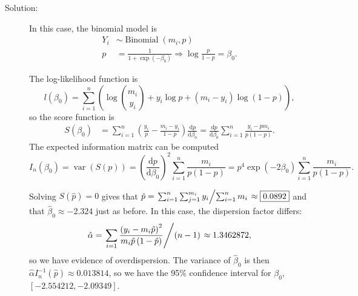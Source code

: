 \documentclass[11pt, letterpaper]{article}
\begin{document}
\begin{enumerate}[(a)]
\begin{description}
\item[Solution:] In this case, the binomial model is
  \begin{align*}
    Y_{i}
    &\sim \operatorname{Binomial}\left(m_i, p\right) \\
    p
    &= \frac{1}{1 + \exp\left(-\beta_0\right)} \Rightarrow
      \log\frac{p}{1 - p} = \beta_0.
  \end{align*}

  The log-likelihood function is
  \begin{equation*}
    l\left(\beta_0\right) = \sum_{i=1}^n\left(
      \log{m_i \choose y_i} + y_i\log p + \left(m_i - y_i\right)\log\left(1 - p\right)
    \right),
  \end{equation*}
  so the score function is
  \begin{align*}
    S\left(\beta_0\right)
    &= \sum_{i=1}^n\left(\frac{y_i}{p} - \frac{m_i - y_i}{1 - p}\right)\frac{\mathrm{d}p}{\mathrm{d}\beta_0}
      = \frac{\mathrm{d}p}{\mathrm{d}\beta_0}\sum_{i=1}^n\frac{y_i - pm_i}{p\left(1 - p\right)}.
  \end{align*}
  The expected information matrix can be computed
  \begin{equation*}
    I_n\left(\beta_0\right) = \operatorname{var}\left(S\left(p\right)\right)
    = \left(\frac{\mathrm{d}p}{\mathrm{d}\beta_0}\right)^2\sum_{i=1}^n\frac{m_i}{p\left(1 - p\right)}
    = p^4\exp\left(-2\beta_0\right)\sum_{i=1}^n\frac{m_i}{p\left(1 - p\right)}.
  \end{equation*}
  
  Solving $S\left(\hat{p}\right) = 0$ gives that
  $\hat{p} = \left.\sum_{i=1}^n\sum_{j=1}^{m_i}y_i\middle/\sum_{i=1}^n
    m_i\right. \approx \boxed{0.0892}$ and that $\hat{\beta}_0 \approx -2.324$
  just as before. In this case, the dispersion factor differs:
  \begin{equation*}
    \hat{\alpha} =
    \left.
      \sum_{i=1}\frac{\left(y_{i} - m_i\hat{p}\right)^2}{m_i\hat{p}\left(1 - \hat{p}\right)}
      \middle/\left(n - 1\right)
    \right. \approx 1.3462872,
  \end{equation*}
  so we have evidence of overdispersion. The variance of $\hat{\beta}_0$ is then
  $\hat{\alpha}I_n^{-1}\left(\hat{p}\right) \approx 0.013814$, so we have the 95\% confidence
  interval for $\beta_0$, $\left[-2.554212, -2.09349\right]$.


\end{description}
\end{enumerate}
\end{document}
